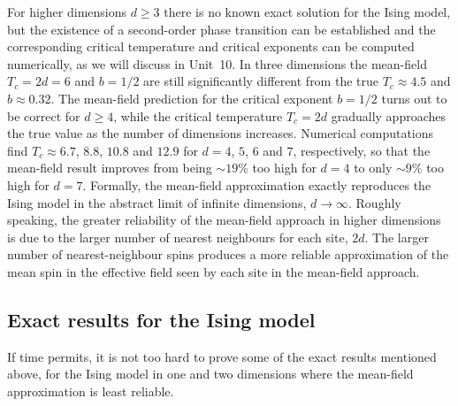 For higher dimensions $d \geq 3$ there is no known exact solution for the Ising model, but the existence of a second-order phase transition can be established and the corresponding critical temperature and critical exponents can be computed numerically, as we will discuss in Unit~10.
In three dimensions the mean-field $T_c = 2d = 6$ and $b = 1 / 2$ are still significantly different from the true $T_c \approx 4.5$ and $b \approx 0.32$. %
The mean-field prediction for the critical exponent $b = 1 / 2$ turns out to be correct for $d \geq 4$, while the critical temperature $T_c = 2d$ gradually approaches the true value as the number of dimensions increases.
Numerical computations find $T_c \approx 6.7$, $8.8$, $10.8$ and $12.9$ for $d = 4$, $5$, $6$ and $7$, respectively, so that the mean-field result improves from being $\sim$$19\%$ too high for $d = 4$ to only $\sim$$9\%$ too high for $d = 7$. %
Formally, the mean-field approximation exactly reproduces the Ising model in the abstract limit of infinite dimensions, $d \to \infty$.
Roughly speaking, the greater reliability of the mean-field approach in higher dimensions is due to the larger number of nearest neighbours for each site, $2d$.
The larger number of nearest-neighbour spins produces a more reliable approximation of the mean spin in the effective field seen by each site in the mean-field approach.



\subsection{Exact results for the Ising model}
If time permits, it is not too hard to prove some of the exact results mentioned above, for the Ising model in one and two dimensions where the mean-field approximation is least reliable.

